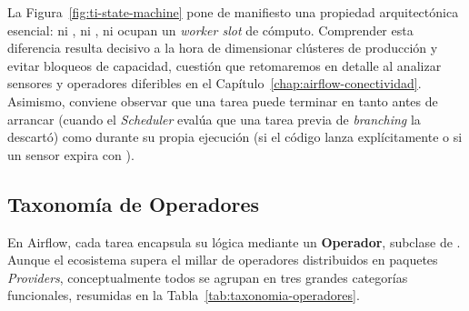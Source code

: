 La Figura~\ref{fig:ti-state-machine} pone de manifiesto una propiedad arquitectónica esencial: ni , ni , ni  ocupan un \textit{worker slot} de cómputo. Comprender esta diferencia resulta decisivo a la hora de dimensionar clústeres de producción y evitar bloqueos de capacidad, cuestión que retomaremos en detalle al analizar sensores y operadores diferibles en el Capítulo~\ref{chap:airflow-conectividad}. Asimismo, conviene observar que una tarea puede terminar en  tanto antes de arrancar (cuando el \textit{Scheduler} evalúa que una tarea previa de \textit{branching} la descartó) como durante su propia ejecución (si el código lanza explícitamente  o si un sensor expira con ).

\subsection{Taxonomía de Operadores}

En Airflow, cada tarea encapsula su lógica mediante un \textbf{Operador}, subclase de . Aunque el ecosistema supera el millar de operadores distribuidos en paquetes \textit{Providers}, conceptualmente todos se agrupan en tres grandes categorías funcionales, resumidas en la Tabla~\ref{tab:taxonomia-operadores}.

